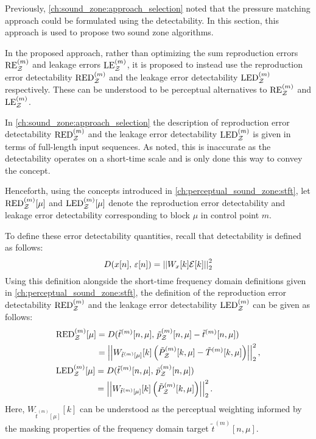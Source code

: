 Previously, \autoref{ch:sound_zone:approach_selection} noted that the pressure matching approach could be formulated using the detectability.
In this section, this approach is used to propose two sound zone algorithms.

In the proposed approach, rather than optimizing the sum reproduction errors $\text{RE}^{(m)}_{\mathcal{Z}}$ and leakage errors $\text{LE}^{(m)}_{\mathcal{Z}}$, it is proposed to instead use the reproduction error detectability $\text{RED}^{(m)}_{\mathcal{Z}}$ and the leakage error detectability $\text{LED}^{(m)}_{\mathcal{Z}}$ respectively.
These can be understood to be perceptual alternatives to $\text{RE}^{(m)}_{\mathcal{Z}}$ and $\text{LE}^{(m)}_{\mathcal{Z}}$.

In \autoref{ch:sound_zone:approach_selection} the description of reproduction error detectability $\text{RED}^{(m)}_{\mathcal{Z}}$ and the leakage error detectability $\text{LED}^{(m)}_{\mathcal{Z}}$ is given in terms of full-length input sequences.
As noted, this is inaccurate as the detectability operates on a short-time scale and is only done this way to convey the concept. 

Henceforth, using the concepts introduced in \autoref{ch:perceptual_sound_zone:stft}, let $\text{RED}^{(m)}_{\mathcal{Z}}[\mu]$ and $\text{LED}^{(m)}_{\mathcal{Z}}[\mu]$ denote the reproduction error detectability and leakage error detectability corresponding to block $\mu$ in control point $m$. 

To define these error detectability quantities, recall that detectability is defined as follows: 
\begin{equation}
    D(x[n],\,\varepsilon[n]) = \norm[2][2]{W_x[k]\mathcal{E}[k]} 
\end{equation}
Using this definition alongside the short-time frequency domain definitions given in \autoref{ch:perceptual_sound_zone:stft}, the definition of the reproduction error detectability $\text{RED}^{(m)}_{\mathcal{Z}}$ and the leakage error detectability $\text{LED}^{(m)}_{\mathcal{Z}}$ can be given as follows:
\begin{align}
    &\begin{aligned}
        \text{RED}^{(m)}_\zz[\mu] &= D(\tilde{t}^{(m)}[n, \mu],\,\tilde{p}_\zz^{(m)}[n, \mu] - \tilde{t}^{(m)}[n, \mu]) \\
                       &= \norm[2][2]{W_{\tilde{t}^{(m)}[\mu]}[k]
                            \left(\tilde{P}_\zz^{(m)}[k, \mu] - \tilde{T}^{(m)}[k, \mu]\right)},
    \end{aligned}\\
    &\begin{aligned}
        \text{LED}^{(m)}_\zz[\mu] &= D(\tilde{t}^{(m)}[n, \mu],\,\tilde{p}_\zz^{(m)}[n, \mu]) \\
                       &= \norm[2][2]{W_{\tilde{t}^{(m)}[\mu]}[k]
                            \left(\tilde{P}_\zz^{(m)}[k, \mu]\right)}.
    \end{aligned}
\end{align}
Here, $W_{\tilde{t}^{(m)}[\mu]}[k]$ can be understood as the perceptual weighting informed by the masking properties of the frequency domain target $\tilde{t}^{(m)}[n, \mu]$.

